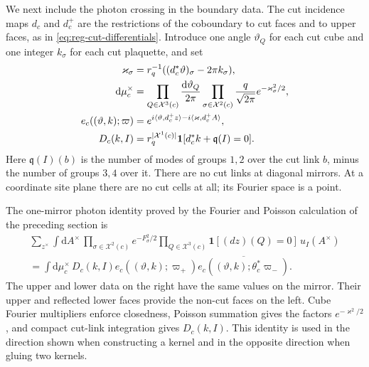 \documentclass[11pt,letterpaper,reqno]{amsart}
\newcommand{\dd}{\mathrm d}
\begin{document}
We next include the photon crossing in the boundary data. The cut
incidence maps $d_c$ and $d_c^+$ are the restrictions of the coboundary
to cut faces and to upper faces, as in
\eqref{eq:reg-cut-differentials}. Introduce one angle $\vartheta_Q$
for each cut cube and one integer $k_\sigma$ for each cut plaquette,
and set
\begin{align}\label{eq:slab-dual-measure}
 \varkappa_\sigma&=r_q^{-1}
       ((d_c^*\vartheta)_\sigma-2\pi k_\sigma),\notag\\
 \dd\mu_c^\times&=
      \prod_{Q\in\mathcal X^3(c)}\frac{\dd\vartheta_Q}{2\pi}
      \prod_{\sigma\in\mathcal X^2(c)}
                     \frac{q}{\sqrt{2\pi}}e^{-\varkappa_\sigma^2/2},\\
 e_c((\vartheta,k);\varpi)&=
       e^{i\langle\vartheta,d_c^+z\rangle
                             -i\langle\varkappa,d_c^+A\rangle},\notag\\
 D_c(k,I)&=r_q^{|\mathcal X^1(c)|}
       \mathbf1[d_c^*k+\mathfrak q(I)=0].\notag
\end{align}
Here $\mathfrak q(I)(b)$ is the number of modes of groups $1,2$ over
the cut link $b$, minus the number of groups $3,4$ over it. There are
no cut links at diagonal mirrors. At a coordinate site plane there
are no cut cells at all; its Fourier space is a point.

The one-mirror photon identity proved by the Fourier and Poisson
calculation of the preceding section is
\begin{multline}\label{eq:slab-photon-gluing}
 \sum_{z^\times}\int\dd A^\times\,
       \prod_{\sigma\in\mathcal X^2(c)}e^{-F_\sigma^2/2}
       \prod_{Q\in\mathcal X^3(c)}\mathbf1[(dz)(Q)=0]\,u_I(A^\times)
       \\
 =\int\dd\mu_c^\times\,D_c(k,I)
           e_c((\vartheta,k);\varpi_+)
            \overline{e_c((\vartheta,k);\theta_c^*\varpi_-)}.
\end{multline}
The upper and lower data on the right have the same values on the
mirror. Their upper and reflected lower faces provide the non-cut
faces on the left. Cube Fourier multipliers enforce closedness,
Poisson summation gives the factors $e^{-\varkappa^2/2}$, and compact
cut-link integration gives $D_c(k,I)$. This identity is used in the
direction shown when constructing a kernel and in the opposite
direction when gluing two kernels.
\end{document}

